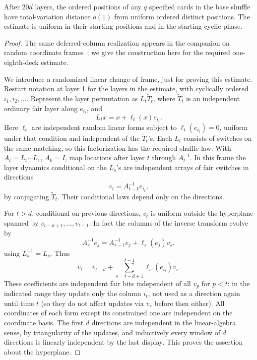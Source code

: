 \begin{lemma}\label{lem:overlay-preparation}
After \(20d\) layers, the ordered positions of any \(q\) specified cards in the base shuffle have total-variation distance \(o(1)\) from uniform ordered distinct positions. The estimate is uniform in their starting positions and in the starting cyclic phase.
\end{lemma}
\begin{proof}
The same deferred-column realization appears in the companion on random coordinate frames~\cite[Lemma ``Independent shear realization'']{random-frames}; we give the construction here for the required one-eighth-deck estimate.

We introduce a randomized linear change of frame, just for proving this estimate. Restart notation at layer 1 for the layers in the estimate, with cyclically ordered \(i_1,i_2,\ldots\). Represent the layer permutation as \(L_t\widetilde T_t\), where \(\widetilde T_t\) is an independent ordinary fair layer along \(e_{i_t}\), and
\[
 L_t x=x+\ell_t(x)e_{i_t}.
\]
Here \(\ell_t\) are independent random linear forms subject to \(\ell_t(e_{i_t})=0\), uniform under that condition and independent of the \(\widetilde T_t\)'s. Each \(L_t\) consists of switches on the same matching, so this factorization has the required shuffle law. With \(A_t=L_t\cdots L_1\), \(A_0=I\), map locations after layer \(t\) through \(A_t^{-1}\). In this frame the layer dynamics conditional on the \(L_s\)'s are independent arrays of fair switches in directions
\[
 v_t=A_{t-1}^{-1}e_{i_t},
\]
by conjugating \(\widetilde T_t\). Their conditional laws depend only on the directions.

For \(t>d\), conditional on previous directions, \(v_t\) is uniform outside the hyperplane spanned by \(v_{t-d+1},\ldots,v_{t-1}\). In fact the columns of the inverse transform evolve by
\[
 A_s^{-1} e_j=A_{s-1}^{-1}e_j+\ell_s(e_j)v_s,
\]
using \(L_s^{-1}=L_s\). Thus
\[
 v_t=v_{t-d}+\sum_{s=t-d+1}^{t-1}\ell_s(e_{i_t})v_s .
\]
These coefficients are independent fair bits independent of all \(v_p\) for \(p<t\): in the indicated range they update only the column \(i_t\), not used as a direction again until time \(t\) (so they do not affect updates via \(v_s\) before then either). All coordinates of each form except its constrained one are independent on the coordinate basis. The first \(d\) directions are independent in the linear-algebra sense, by triangularity of the updates, and inductively every window of \(d\) directions is linearly independent by the last display. This proves the assertion about the hyperplane.


\end{proof}
